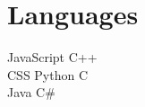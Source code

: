 \documentclass[]{resume}
\begin{document}
\begin{minipage}[t]{0.33\textwidth}
\sectionsep


\section{Languages}


JavaScript \textbullet{} C++ \\
CSS \textbullet{} Python \textbullet{} C \\
Java \textbullet{} C\# \\%


%
%

\end{minipage}
\hfill
\end{document}
